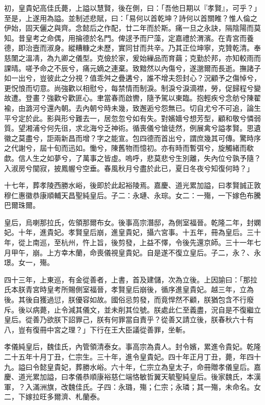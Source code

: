 \begin{pinyinscope}
初，皇貴妃高佳氏薨，上謚以慧賢，後在側，曰：「吾他日期以『孝賢』，可乎？」至是，上遂用為謚。並制述悲賦，曰：「易何以首乾坤？詩何以首關睢？惟人倫之伊始，固天儷之與齊。念懿后之作配，廿二年而於斯。痛一旦之永訣，隔陰陽而莫知。昔皇考之命偶，用掄德於名門。俾逑予而尸藻，定嘉禮於渭濱。在青宮而養德，即治壼而淑身。縱糟糠之未歷，實同甘而共辛。乃其正位坤寧，克贊乾清。奉慈闈之溫凊，為九卿之儀型。克儉於家，爰始繅品而育繭；克勤於邦，亦知較雨而課晴。嗟予命之不辰兮，痛元嫡之連棄。致黯然以內傷兮，遂邈爾而長逝。撫諸子如一出兮，豈彼此之分視？值乖舛之疊遘兮，誰不增夫怨封心？況顧予之傷悼兮，更怳悢而切意。尚強歡以相慰兮，每禁情而制淚。制淚兮淚滴襟，勞，促歸程兮變故遭。登畫？強歡兮歡匪心。聿當春而啟轡，隨予駕以東臨。抱輕疾兮念舫兮陳翟褕，由潞河兮還內朝。去內朝兮時未幾，致邂逅兮怨無已。切自尤兮不可追，論生平兮定於此。影與形兮難去一，居忽忽兮如有失。對嬪嬙兮想芳型，顧和敬兮憐弱質。望湘浦兮何先徂，求北海兮乏神術。循喪儀兮愴徒然，例展禽兮謚孝賢。思遺徽之莫盡兮，詎兩新昌而增？字之能宣。包四德而首出兮，謂庶幾其可傳。驚時序之代謝兮，屆十旬而迅如。慟兮，陳舊物而憶初。亦有時而暫弭兮，旋觸緒而欷歔。信人生之如夢兮，了萬事之皆虛。嗚呼，悲莫悲兮生別離，失內位兮孰予隨？入淑房兮闃寂，披鳳幄兮空垂。春風秋月兮盡於此已，夏日冬夜兮知復何時？」

十七年，葬孝陵西勝水峪，後即於此起裕陵焉。嘉慶、道光累加謚，曰孝賢誠正敦穆仁惠徽恭康順輔天昌聖純皇后。子二：永璉、永琮。女二：一殤，一下嫁色布騰巴爾珠爾。

皇后，烏喇那拉氏，佐領那爾布女。後事高宗潛邸，為側室福晉。乾隆二年，封嫻妃。十年，進貴妃。孝賢皇后崩，進皇貴妃，攝六宮事。十五年，冊為皇后。三十年，從上南巡，至杭州，忤上旨，後剪發，上益不懌，令後先還京師。三十一年七月甲午，崩。上方幸木蘭，命喪儀視皇貴妃。自是遂不復立皇后。子二，永？、永璟。女一，殤。

四十三年，上東巡，有金從善者，上書，首及建儲，次為立後。上因諭曰：「那拉氏本朕青宮時皇考所賜側室福晉，孝賢皇后崩後，循序進皇貴妃。越三年，立為後。其後自獲過愆，朕優容如故。國俗忌剪發，而竟悍然不顧，朕猶包含不行廢斥。後以病薨，止令減其儀文，並未削其位號。朕處此仁至義盡，況自是不復繼立皇后。從善乃欲朕下詔罪己，朕有何罪當自責乎？從善又請立後，朕春秋六十有八，豈有復冊中宮之理？」下行在王大臣議從善罪，坐斬。

孝儀純皇后，魏佳氏，內管領清泰女。事高宗為貴人。封令嬪，累進令貴妃。乾隆二十五年十月丁丑，仁宗生。三十年，進令皇貴妃。四十年正月丁丑，薨，年四十九。謚曰令懿皇貴妃，葬勝水峪。六十年，仁宗立為皇太子，命冊贈孝儀皇后。嘉慶、道光累加謚，曰孝儀恭順康裕慈仁端恪敏哲翼天毓聖純皇后。後家魏氏，本漢軍，？入滿洲旗，改魏佳氏。子四：永璐，殤；仁宗；永璘；其一殤，未命名。女二，下嫁拉旺多爾濟、札蘭泰。


\end{pinyinscope}
